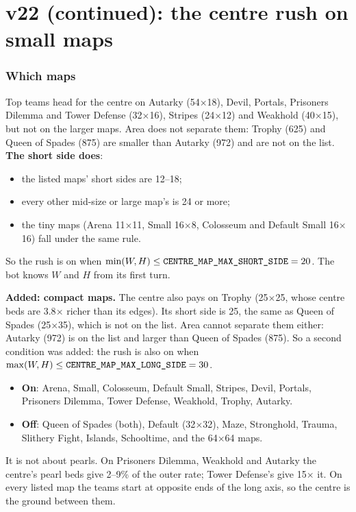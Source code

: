 \documentclass[11pt,a4paper]{article}
\newcommand{\code}[1]{\texttt{\detokenize{#1}}}
\begin{document}
\part{v22 (continued): the centre rush on small maps}
\section{Which maps}
Top teams head for the centre on Autarky (54$\times$18), Devil, Portals, Prisoners Dilemma and Tower Defense (32$\times$16),
Stripes (24$\times$12) and Weakhold (40$\times$15), but not on the larger maps. Area does not separate them: Trophy (625) and
Queen of Spades (875) are smaller than Autarky (972) and are not on the list. \textbf{The short side does}:
\begin{itemize}
      \item the listed maps' short sides are 12--18;
      \item every other mid-size or large map's is 24 or more;
      \item the tiny maps (Arena 11$\times$11, Small 16$\times$8, Colosseum and Default Small 16$\times$16) fall under the same rule.
\end{itemize}
So the rush is on when $\min(W,H) \leq \code{CENTRE_MAP_MAX_SHORT_SIDE} = 20$. The bot knows $W$ and $H$ from its first turn.

\textbf{Added: compact maps.} The centre also pays on Trophy (25$\times$25, whose centre beds are 3.8$\times$ richer than its edges).
Its short side is 25, the same as Queen of Spades (25$\times$35), which is not on the list. Area cannot separate them either: Autarky
(972) is on the list and larger than Queen of Spades (875). So a second condition was added: the rush is also on when
$\max(W,H) \leq \code{CENTRE_MAP_MAX_LONG_SIDE} = 30$.
\begin{itemize}
      \item \textbf{On}: Arena, Small, Colosseum, Default Small, Stripes, Devil, Portals, Prisoners Dilemma, Tower Defense, Weakhold,
            Trophy, Autarky.
      \item \textbf{Off}: Queen of Spades (both), Default (32$\times$32), Maze, Stronghold, Trauma, Slithery Fight, Islands, Schooltime,
            and the 64$\times$64 maps.
\end{itemize}

It is not about pearls. On Prisoners Dilemma, Weakhold and Autarky the centre's pearl beds give 2--9\% of the outer rate;
Tower Defense's give 15$\times$ it. On every listed map the teams start at opposite ends of the long axis, so the centre is the
ground between them.
\end{document}
